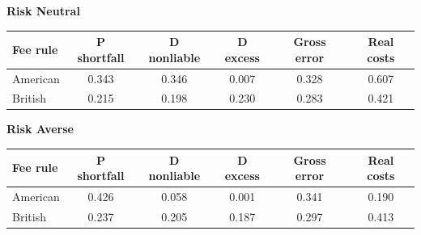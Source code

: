 \documentclass[10pt,border=5pt,varwidth=17cm]{standalone}
\begin{document}
\begingroup
\small
\setlength{\tabcolsep}{5pt}
\renewcommand{\arraystretch}{1.20}
\noindent\textbf{Risk Neutral}\par\smallskip
\noindent\begin{tabularx}{\linewidth}{@{}>{\raggedright\arraybackslash}Xccccc@{}}
\toprule
\textbf{Fee rule} & \textbf{P shortfall} & \textbf{D nonliable} & \textbf{D excess} & \textbf{Gross error} & \textbf{Real costs} \\
\midrule
American & 0.343 & 0.346 & 0.007 & 0.328 & 0.607 \\
British & 0.215 & 0.198 & 0.230 & 0.283 & 0.421 \\
\bottomrule\end{tabularx}\par\medskip
\noindent\textbf{Risk Averse}\par\smallskip
\noindent\begin{tabularx}{\linewidth}{@{}>{\raggedright\arraybackslash}Xccccc@{}}
\toprule
\textbf{Fee rule} & \textbf{P shortfall} & \textbf{D nonliable} & \textbf{D excess} & \textbf{Gross error} & \textbf{Real costs} \\
\midrule
American & 0.426 & 0.058 & 0.001 & 0.341 & 0.190 \\
British & 0.237 & 0.205 & 0.187 & 0.297 & 0.413 \\
\bottomrule\end{tabularx}\par\medskip
\endgroup
\end{document}
